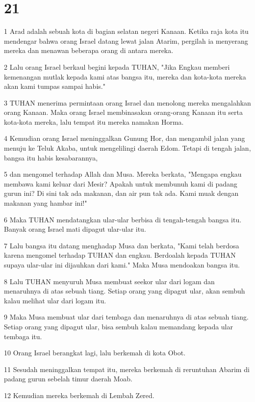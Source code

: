 \chapter{21}

\par 1 Arad adalah sebuah kota di bagian selatan negeri Kanaan. Ketika raja kota itu mendengar bahwa orang Israel datang lewat jalan Atarim, pergilah ia menyerang mereka dan menawan beberapa orang di antara mereka.
\par 2 Lalu orang Israel berkaul begini kepada TUHAN, "Jika Engkau memberi kemenangan mutlak kepada kami atas bangsa itu, mereka dan kota-kota mereka akan kami tumpas sampai habis."
\par 3 TUHAN menerima permintaan orang Israel dan menolong mereka mengalahkan orang Kanaan. Maka orang Israel membinasakan orang-orang Kanaan itu serta kota-kota mereka, lalu tempat itu mereka namakan Horma.
\par 4 Kemudian orang Israel meninggalkan Gunung Hor, dan mengambil jalan yang menuju ke Teluk Akaba, untuk mengelilingi daerah Edom. Tetapi di tengah jalan, bangsa itu habis kesabarannya,
\par 5 dan mengomel terhadap Allah dan Musa. Mereka berkata, "Mengapa engkau membawa kami keluar dari Mesir? Apakah untuk membunuh kami di padang gurun ini? Di sini tak ada makanan, dan air pun tak ada. Kami muak dengan makanan yang hambar ini!"
\par 6 Maka TUHAN mendatangkan ular-ular berbisa di tengah-tengah bangsa itu. Banyak orang Israel mati dipagut ular-ular itu.
\par 7 Lalu bangsa itu datang menghadap Musa dan berkata, "Kami telah berdosa karena mengomel terhadap TUHAN dan engkau. Berdoalah kepada TUHAN supaya ular-ular ini dijauhkan dari kami." Maka Musa mendoakan bangsa itu.
\par 8 Lalu TUHAN menyuruh Musa membuat seekor ular dari logam dan menaruhnya di atas sebuah tiang. Setiap orang yang dipagut ular, akan sembuh kalau melihat ular dari logam itu.
\par 9 Maka Musa membuat ular dari tembaga dan menaruhnya di atas sebuah tiang. Setiap orang yang dipagut ular, bisa sembuh kalau memandang kepada ular tembaga itu.
\par 10 Orang Israel berangkat lagi, lalu berkemah di kota Obot.
\par 11 Sesudah meninggalkan tempat itu, mereka berkemah di reruntuhan Abarim di padang gurun sebelah timur daerah Moab.
\par 12 Kemudian mereka berkemah di Lembah Zered.
